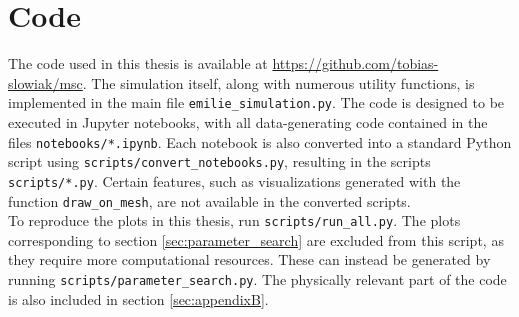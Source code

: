 \section{Code}
The code used in this thesis is available at \url{https://github.com/tobias-slowiak/msc}. The simulation itself, along with numerous utility functions, is implemented in the main file \texttt{emilie\_simulation.py}. The code is designed to be executed in Jupyter notebooks, with all data-generating code contained in the files \texttt{notebooks/*.ipynb}. Each notebook is also converted into a standard Python script using \texttt{scripts/convert\_notebooks.py}, resulting in the scripts \texttt{scripts/*.py}. Certain features, such as \ngsolve visualizations generated with the function \texttt{draw\_on\_mesh}, are not available in the converted scripts.\\
To reproduce the plots in this thesis, run \texttt{scripts/run\_all.py}. The plots corresponding to section \ref{sec:parameter_search} are excluded from this script, as they require more computational resources. These can instead be generated by running \texttt{scripts/parameter\_search.py}. The physically relevant part of the code is also included in section \ref{sec:appendixB}.\\

\newpage
